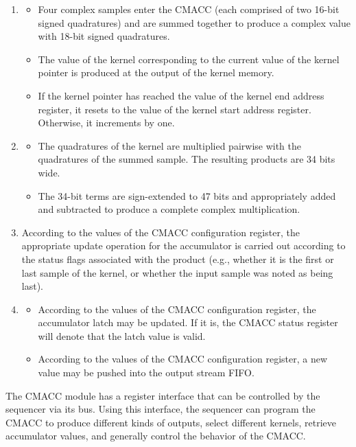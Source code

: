 \begin{enumerate}
  \item
  \begin{itemize}
    \item Four complex samples enter the CMACC (each comprised of two 16-bit signed quadratures) and are summed together to produce a complex value with 18-bit signed quadratures.
    \item The value of the kernel corresponding to the current value of the kernel pointer is produced at the output of the kernel memory.
    \item If the kernel pointer has reached the value of the kernel end address register, it resets to the value of the kernel start address register. Otherwise, it increments by one. 
  \end{itemize} 

  \item 
  \begin{itemize}
    \item The quadratures of the kernel are multiplied pairwise with the quadratures of the summed sample. The resulting products are 34 bits wide.
    \item The 34-bit terms are sign-extended to 47 bits and appropriately added and subtracted to produce a complete complex multiplication.
  \end{itemize}
  
  \item According to the values of the CMACC configuration register, the appropriate update operation for the accumulator is carried out according to the status flags associated with the product (e.g., whether it is the first or last sample of the kernel, or whether the input sample was noted as being last).
  
  \item
  \begin{itemize}
    \item According to the values of the CMACC configuration register, the accumulator latch may be updated. If it is, the CMACC status register will denote that the latch value is valid. 
    \item According to the values of the CMACC configuration register, a new value may be pushed into the output stream FIFO. 
  \end{itemize}
\end{enumerate}

The CMACC module has a register interface that can be controlled by the sequencer via its bus. Using this interface, the sequencer can program the CMACC to produce different kinds of outputs, select different kernels, retrieve accumulator values, and generally control the behavior of the CMACC. 

